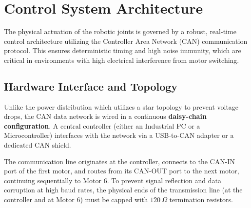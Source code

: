 \documentclass{article}
\begin{document}
\section{Control System Architecture}

The physical actuation of the robotic joints is governed by a robust, real-time control architecture utilizing the Controller Area Network (CAN) communication protocol. This ensures deterministic timing and high noise immunity, which are critical in environments with high electrical interference from motor switching.

\subsection{Hardware Interface and Topology}
Unlike the power distribution which utilizes a star topology to prevent voltage drops, the CAN data network is wired in a continuous \textbf{daisy-chain configuration}. A central controller (either an Industrial PC or a Microcontroller) interfaces with the network via a USB-to-CAN adapter or a dedicated CAN shield. 

\noindent
The communication line originates at the controller, connects to the CAN-IN port of the first motor, and routes from its CAN-OUT port to the next motor, continuing sequentially to Motor 6. To prevent signal reflection and data corruption at high baud rates, the physical ends of the transmission line (at the controller and at Motor 6) must be capped with $120~\Omega$ termination resistors.
\end{document}
